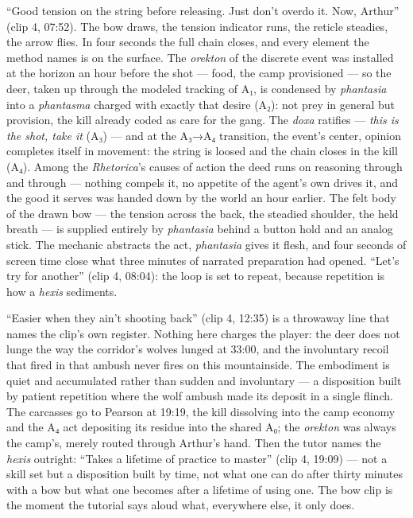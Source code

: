 \documentclass{article}
\begin{document}
``Good tension on the string before releasing. Just don't overdo it. Now, Arthur'' (clip 4, 07:52). The bow draws, the tension indicator runs, the reticle steadies, the arrow flies. In four seconds the full chain closes, and every element the method names is on the surface. The \textit{orekton} of the discrete event was installed at the horizon an hour before the shot — food, the camp provisioned — so the deer, taken up through the modeled tracking of A₁, is condensed by \textit{phantasia} into a \textit{phantasma} charged with exactly that desire (A₂): not prey in general but provision, the kill already coded as care for the gang. The \textit{doxa} ratifies — \textit{this is the shot, take it} (A₃) — and at the A₃→A₄ transition, the event's center, opinion completes itself in movement: the string is loosed and the chain closes in the kill (A₄). Among the \textit{Rhetorica}'s causes of action the deed runs on reasoning through and through — nothing compels it, no appetite of the agent's own drives it, and the good it serves was handed down by the world an hour earlier. The felt body of the drawn bow — the tension across the back, the steadied shoulder, the held breath — is supplied entirely by \textit{phantasia} behind a button hold and an analog stick. The mechanic abstracts the act, \textit{phantasia} gives it flesh, and four seconds of screen time close what three minutes of narrated preparation had opened. ``Let's try for another'' (clip 4, 08:04): the loop is set to repeat, because repetition is how a \textit{hexis} sediments.

``Easier when they ain't shooting back'' (clip 4, 12:35) is a throwaway line that names the clip's own register. Nothing here charges the player: the deer does not lunge the way the corridor's wolves lunged at 33:00, and the involuntary recoil that fired in that ambush never fires on this mountainside. The embodiment is quiet and accumulated rather than sudden and involuntary — a disposition built by patient repetition where the wolf ambush made its deposit in a single flinch. The carcasses go to Pearson at 19:19, the kill dissolving into the camp economy and the A₄ act depositing its residue into the shared A₀; the \textit{orekton} was always the camp's, merely routed through Arthur's hand. Then the tutor names the \textit{hexis} outright: ``Takes a lifetime of practice to master'' (clip 4, 19:09) — not a skill set but a disposition built by time, not what one can do after thirty minutes with a bow but what one becomes after a lifetime of using one. The bow clip is the moment the tutorial says aloud what, everywhere else, it only does.
\end{document}
